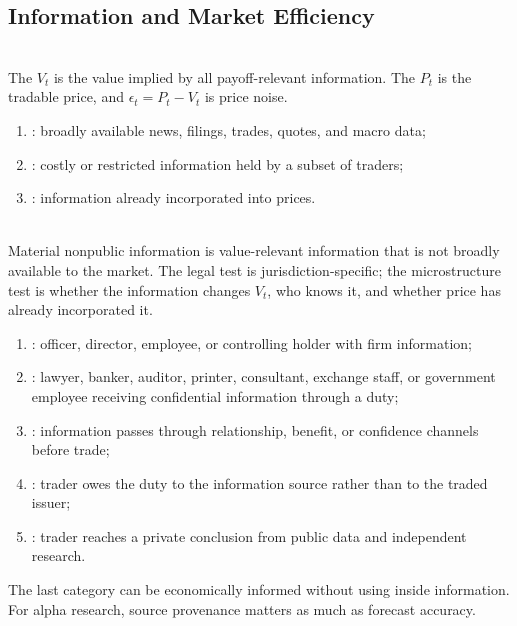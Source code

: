 \documentclass[a4paper,oneside,openany]{book}
\begin{document}
\subsection*{Information and Market Efficiency}

\begin{definition} \\
The  $V_t$ is the value implied by all payoff-relevant information. The  $P_t$ is the tradable price, and $\epsilon_t=P_t-V_t$ is price noise.
\end{definition}

\begin{taxonomy} 
\begin{enumerate}[label=\roman*.]
\setlength{\itemsep}{0pt}
\item {}: broadly available news, filings, trades, quotes, and macro data;
\item {}: costly or restricted information held by a subset of traders;
\item {}: information already incorporated into prices.
\end{enumerate}
\end{taxonomy}

\begin{definition} \\
Material nonpublic information is value-relevant information that is not broadly available to the market. The legal test is jurisdiction-specific; the microstructure test is whether the information changes $V_t$, who knows it, and whether price has already incorporated it.
\end{definition}

\begin{taxonomy} 
\begin{enumerate}[label=\roman*.]
\setlength{\itemsep}{0pt}
\item {}: officer, director, employee, or controlling holder with firm information;
\item {}: lawyer, banker, auditor, printer, consultant, exchange staff, or government employee receiving confidential information through a duty;
\item {}: information passes through relationship, benefit, or confidence channels before trade;
\item {}: trader owes the duty to the information source rather than to the traded issuer;
\item {}: trader reaches a private conclusion from public data and independent research.
\end{enumerate}
The last category can be economically informed without using inside information. For alpha research, source provenance matters as much as forecast accuracy.
\end{taxonomy}
\end{document}
